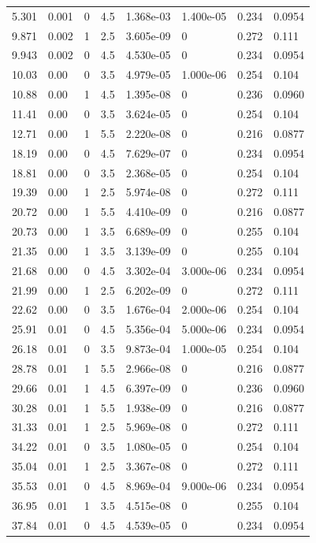 \documentclass[preview]{standalone}
\begin{document}
{{\begin{tabular}{L{1.2cm}C{1.2cm} C{0.3cm}C{0.5cm} C{1.4cm}C{1.4cm} C{1.4cm}C{1.4cm}}
  5.301  &  0.001  & 0     & 4.5 &  1.368e-03  & 1.400e-05  & 0.234 &  0.0954   \\ 
  9.871  &  0.002  & 1     & 2.5 &  3.605e-09  & 0  & 0.272 &  0.111   \\ 
  9.943  &  0.002  & 0     & 4.5 &  4.530e-05  & 0  & 0.234 &  0.0954   \\ 
  10.03  &  0.00  & 0     & 3.5 &  4.979e-05  & 1.000e-06  & 0.254 &  0.104   \\ 
  10.88  &  0.00  & 1     & 4.5 &  1.395e-08  & 0  & 0.236 &  0.0960   \\ 
  11.41  &  0.00  & 0     & 3.5 &  3.624e-05  & 0  & 0.254 &  0.104   \\ 
  12.71  &  0.00  & 1     & 5.5 &  2.220e-08  & 0  & 0.216 &  0.0877   \\ 
  18.19  &  0.00  & 0     & 4.5 &  7.629e-07  & 0  & 0.234 &  0.0954   \\ 
  18.81  &  0.00  & 0     & 3.5 &  2.368e-05  & 0  & 0.254 &  0.104   \\ 
  19.39  &  0.00  & 1     & 2.5 &  5.974e-08  & 0  & 0.272 &  0.111   \\ 
  20.72  &  0.00  & 1     & 5.5 &  4.410e-09  & 0  & 0.216 &  0.0877   \\ 
  20.73  &  0.00  & 1     & 3.5 &  6.689e-09  & 0  & 0.255 &  0.104   \\ 
  21.35  &  0.00  & 1     & 3.5 &  3.139e-09  & 0  & 0.255 &  0.104   \\ 
  21.68  &  0.00  & 0     & 4.5 &  3.302e-04  & 3.000e-06  & 0.234 &  0.0954   \\ 
  21.99  &  0.00  & 1     & 2.5 &  6.202e-09  & 0  & 0.272 &  0.111   \\ 
  22.62  &  0.00  & 0     & 3.5 &  1.676e-04  & 2.000e-06  & 0.254 &  0.104   \\ 
  25.91  &  0.01  & 0     & 4.5 &  5.356e-04  & 5.000e-06  & 0.234 &  0.0954   \\ 
  26.18  &  0.01  & 0     & 3.5 &  9.873e-04  & 1.000e-05  & 0.254 &  0.104   \\ 
  28.78  &  0.01  & 1     & 5.5 &  2.966e-08  & 0  & 0.216 &  0.0877   \\ 
  29.66  &  0.01  & 1     & 4.5 &  6.397e-09  & 0  & 0.236 &  0.0960   \\ 
  30.28  &  0.01  & 1     & 5.5 &  1.938e-09  & 0  & 0.216 &  0.0877   \\ 
  31.33  &  0.01  & 1     & 2.5 &  5.969e-08  & 0  & 0.272 &  0.111   \\ 
  34.22  &  0.01  & 0     & 3.5 &  1.080e-05  & 0  & 0.254 &  0.104   \\ 
  35.04  &  0.01  & 1     & 2.5 &  3.367e-08  & 0  & 0.272 &  0.111   \\ 
  35.53  &  0.01  & 0     & 4.5 &  8.969e-04  & 9.000e-06  & 0.234 &  0.0954   \\ 
  36.95  &  0.01  & 1     & 3.5 &  4.515e-08  & 0  & 0.255 &  0.104   \\ 
  37.84  &  0.01  & 0     & 4.5 &  4.539e-05  & 0  & 0.234 &  0.0954   \\ 
\hline 
\end{tabular} 

}}
\end{document}

